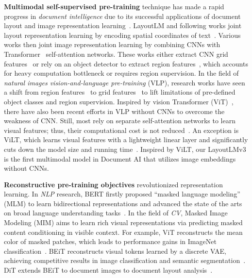\documentclass[sigconf]{acmart}
\begin{document}
\textbf{Multimodal self-supervised pre-training} technique has made a rapid progress in \emph{document intelligence} due to its successful applications of document layout and image representation learning~\cite{xu2020layoutlm,xu-etal-2021-layoutlmv2,xu2021layoutxlm,pramanik2020towards,garncarek2021lambert,hong2022bros,Powalski2021GoingFB,wu2021lampret,Li2021StructuralLMSP,li2021selfdoc,Appalaraju_2021_ICCV,li2021structext,gu2021unidoc,wang2022LiLT,gu2022xylayoutlm,lee2022formnet}.
LayoutLM and following works joint layout representation learning by encoding spatial coordinates of text~\cite{xu2020layoutlm,Li2021StructuralLMSP,hong2022bros,lee2022formnet}. 
Various works then joint image representation learning by combining CNNs with Transformer~\cite{vaswani2017attention} self-attention networks.
These works either extract CNN grid features~\cite{xu-etal-2021-layoutlmv2,Appalaraju_2021_ICCV} or rely on an object detector to extract region features~\cite{xu2020layoutlm,Powalski2021GoingFB,li2021selfdoc,gu2021unidoc}, which accounts for heavy computation bottleneck or requires region supervision.
In the field of \emph{natural images vision-and-language pre-training} (VLP), research works have seen a shift from region features~\cite{tan2019lxmert,su2019vl,chen2020uniter} to grid features~\cite{huang2021seeing} to lift limitations of pre-defined object classes and region supervision.
Inspired by vision Transformer (ViT)~\cite{dosovitskiy2020vit}, there have also been recent efforts in VLP without CNNs to overcome the weakness of CNN. Still, most rely on separate self-attention networks to learn visual features; thus, their computational cost is not reduced~\cite{xue2021probing,li2021align,dou2021empirical}.
An exception is ViLT, which learns visual features with a lightweight linear layer and significantly cuts down the model size and running time~\cite{kim2021vilt}.
Inspired by ViLT, our LayoutLMv3 is the first multimodal model in Document AI that utilizes image embeddings without CNNs.

\textbf{Reconstructive pre-training objectives} revolutionized representation learning.
In \emph{NLP} research, BERT firstly proposed ``masked language modeling'' (MLM) to learn bidirectional representations and advanced the state of the arts on broad language understanding tasks~\cite{devlin2019bert}.
In the field of \emph{CV}, Masked Image Modeling (MIM) aims to learn rich visual representations via predicting masked content conditioning in visible context.
For example, ViT reconstructs the mean color of masked patches, which leads to performance gains in ImageNet classification~\cite{dosovitskiy2020vit}.
BEiT reconstructs visual tokens learned by a discrete VAE, achieving competitive results in image classification and semantic segmentation~\cite{bao2022beit}.
DiT extends BEiT to document images to document layout analysis~\cite{li2022dit}.
\end{document}
